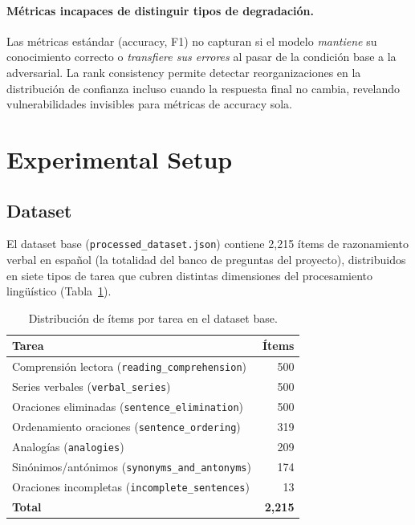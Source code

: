 \documentclass[11pt]{article}
\begin{document}
\paragraph{Métricas incapaces de distinguir tipos de degradación.}
Las métricas estándar (accuracy, F1) no capturan si el modelo
\textit{mantiene} su conocimiento correcto o \textit{transfiere sus
errores} al pasar de la condición base a la adversarial. La rank
consistency \citep{languagespecific2025} permite detectar
reorganizaciones en la distribución de confianza incluso cuando la
respuesta final no cambia, revelando vulnerabilidades invisibles para
métricas de accuracy sola.
 

\section{Experimental Setup}
 
\subsection{Dataset}

 El dataset base (\texttt{processed\_dataset.json}) contiene 2{,}215
ítems de razonamiento verbal en español (la totalidad del banco de
preguntas del proyecto), distribuidos en siete tipos de tarea que
cubren distintas dimensiones del procesamiento lingüístico
(Tabla~\ref{tab:dataset_stats}).
 
\begin{table}[h]
  \centering\small
  \begin{tabular}{lr}
    \toprule
    \textbf{Tarea} & \textbf{Ítems} \\
    \midrule
    Comprensión lectora (\texttt{reading\_comprehension})   & 500 \\
    Series verbales (\texttt{verbal\_series})               & 500 \\
    Oraciones eliminadas (\texttt{sentence\_elimination})   & 500 \\
    Ordenamiento oraciones (\texttt{sentence\_ordering})    & 319 \\
    Analogías (\texttt{analogies})                          & 209 \\
    Sinónimos/antónimos (\texttt{synonyms\_and\_antonyms})  & 174 \\
    Oraciones incompletas (\texttt{incomplete\_sentences})  &  13 \\
    \midrule
    \textbf{Total} & \textbf{2{,}215} \\
    \bottomrule
  \end{tabular}
  \caption{Distribución de ítems por tarea en el dataset base.}
  \label{tab:dataset_stats}
\end{table}
 
\end{document}
